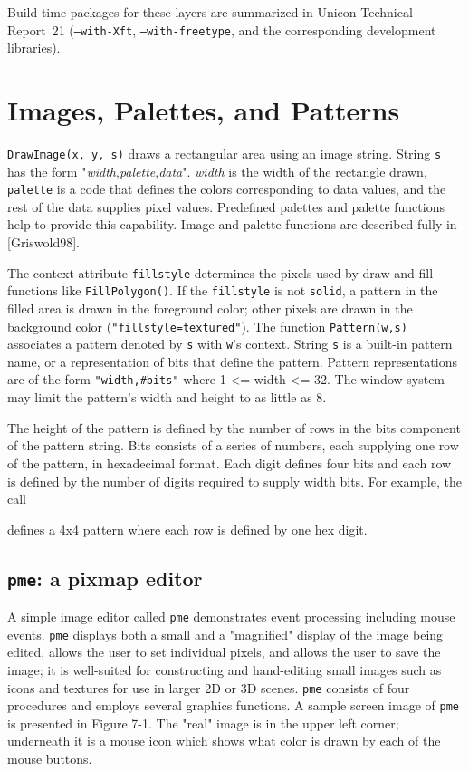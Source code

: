 Build-time packages for these layers are summarized in Unicon
Technical Report~21 (\texttt{--with-Xft}, \texttt{--with-freetype},
and the corresponding development libraries).

\section{Images, Palettes, and Patterns}

\texttt{DrawImage(x, y, s)} draws a rectangular area using an image
string.  String \texttt{s} has the form
"\textit{width},\textit{palette},\textit{data}".  \textit{width} is
the width of the rectangle drawn, \texttt{palette} is a code that
defines the colors corresponding to data values, and the rest of the
data supplies pixel values. Predefined palettes and palette functions
help to provide this capability. Image and palette functions are
described fully in [Griswold98].

The context attribute \texttt{fillstyle} determines the pixels used by
draw and fill functions like \texttt{FillPolygon()}.  If the
\texttt{fillstyle} is not \texttt{solid}, a pattern in the filled area
is drawn in the foreground color; other pixels are drawn in the
background color (\texttt{"fillstyle=textured"}).  The function
\texttt{Pattern(w,s)} associates a pattern denoted by \texttt{s} with
\texttt{w}'s context. String \texttt{s} is a built-in pattern name, or
a representation of bits that define the pattern. Pattern
representations are of the form \texttt{"width,\#bits"} where 1
{\textless}= width {\textless}= 32. The window system may limit the
pattern's width and height to as little as 8.

The height of the pattern is defined by the number of rows in the bits
component of the pattern string. Bits consists of a series of numbers,
each supplying one row of the pattern, in hexadecimal format.  Each
digit defines four bits and each row is defined by the number of
digits required to supply width bits. For example, the call


\noindent defines a 4x4 pattern where each row is defined by one hex digit.

\subsection*{\texttt{pme}: a pixmap editor}

A simple image editor called \texttt{pme} demonstrates event
processing including mouse events. \texttt{pme} displays both a small
and a "magnified" display of the image being edited, allows the user
to set individual pixels, and allows the user to save the image; it is
well-suited for constructing and hand-editing small images such as
icons and textures for use in larger 2D or 3D scenes.  \texttt{pme}
consists of four procedures and employs several graphics functions. A
sample screen image of \texttt{pme} is presented in Figure 7-1. The
"real" image is in the upper left corner; underneath it is a mouse
icon which shows what color is drawn by each of the mouse buttons.



